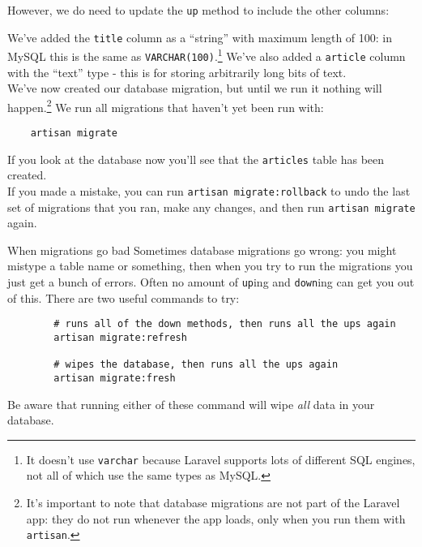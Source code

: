 \pagebreak

However, we do need to update the \texttt{up} method to include the other columns:


We've added the \texttt{title} column as a ``string'' with maximum length of 100: in MySQL this is the same as \texttt{VARCHAR(100)}.\footnote{It doesn't use \texttt{varchar} because Laravel supports lots of different SQL engines, not all of which use the same types as MySQL.} We've also added a \texttt{article} column with the ``text'' type - this is for storing arbitrarily long bits of text.
\\

We've now created our database migration, but until we run it nothing will happen.\footnote{It's important to note that database migrations are not part of the Laravel app: they do not run whenever the app loads, only when you run them with \texttt{artisan}.} We run all migrations that haven't yet been run with:

\begin{verbatim}
    artisan migrate
\end{verbatim}

If you look at the database now you'll see that the \texttt{articles} table has been created.
\\

If you made a mistake, you can run \texttt{artisan migrate:rollback} to undo the last set of migrations that you ran, make any changes, and then run \texttt{artisan migrate} again.

\pagebreak

\begin{infobox}{When migrations go bad}
    Sometimes database migrations go wrong: you might mistype a table name or something, then when you try to run the migrations you just get a bunch of errors. Often no amount of \texttt{up}ing and \texttt{down}ing can get you out of this. There are two useful commands to try:

    \begin{verbatim}
        # runs all of the down methods, then runs all the ups again
        artisan migrate:refresh

        # wipes the database, then runs all the ups again
        artisan migrate:fresh
    \end{verbatim}

    Be aware that running either of these command will wipe \textit{all} data in your database.
\end{infobox}





